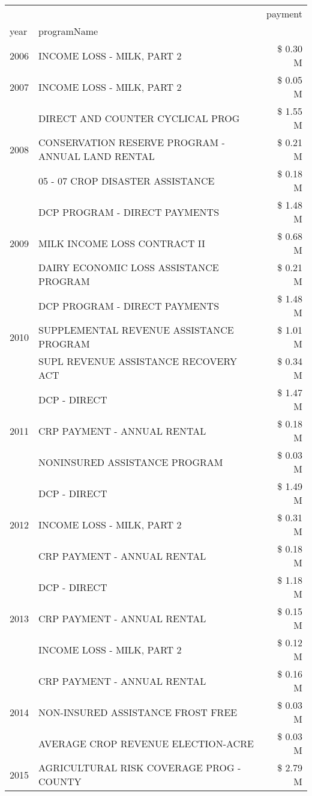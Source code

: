 \begin{tabular}{llr}
\toprule
 &  & payment \\
year & programName &  \\
\midrule
2006 & INCOME LOSS - MILK, PART 2 & \$ 0.30 M \\
\cline{1-3}
2007 & INCOME LOSS - MILK, PART 2 & \$ 0.05 M \\
\cline{1-3}
\multirow[t]{3}{*}{2008} & DIRECT AND COUNTER CYCLICAL PROG & \$ 1.55 M \\
 & CONSERVATION RESERVE PROGRAM - ANNUAL LAND RENTAL & \$ 0.21 M \\
 & 05 - 07 CROP DISASTER ASSISTANCE & \$ 0.18 M \\
\cline{1-3}
\multirow[t]{3}{*}{2009} & DCP PROGRAM - DIRECT PAYMENTS & \$ 1.48 M \\
 & MILK INCOME LOSS CONTRACT II & \$ 0.68 M \\
 & DAIRY ECONOMIC LOSS ASSISTANCE PROGRAM & \$ 0.21 M \\
\cline{1-3}
\multirow[t]{3}{*}{2010} & DCP PROGRAM - DIRECT PAYMENTS & \$ 1.48 M \\
 & SUPPLEMENTAL REVENUE ASSISTANCE PROGRAM & \$ 1.01 M \\
 & SUPL REVENUE ASSISTANCE RECOVERY ACT & \$ 0.34 M \\
\cline{1-3}
\multirow[t]{3}{*}{2011} & DCP - DIRECT & \$ 1.47 M \\
 & CRP PAYMENT - ANNUAL RENTAL & \$ 0.18 M \\
 & NONINSURED ASSISTANCE PROGRAM & \$ 0.03 M \\
\cline{1-3}
\multirow[t]{3}{*}{2012} & DCP - DIRECT & \$ 1.49 M \\
 & INCOME LOSS - MILK, PART 2 & \$ 0.31 M \\
 & CRP PAYMENT - ANNUAL RENTAL & \$ 0.18 M \\
\cline{1-3}
\multirow[t]{3}{*}{2013} & DCP - DIRECT & \$ 1.18 M \\
 & CRP PAYMENT - ANNUAL RENTAL & \$ 0.15 M \\
 & INCOME LOSS - MILK, PART 2 & \$ 0.12 M \\
\cline{1-3}
\multirow[t]{3}{*}{2014} & CRP PAYMENT - ANNUAL RENTAL & \$ 0.16 M \\
 & NON-INSURED ASSISTANCE FROST FREE & \$ 0.03 M \\
 & AVERAGE CROP REVENUE ELECTION-ACRE & \$ 0.03 M \\
\cline{1-3}
\multirow[t]{3}{*}{2015} & AGRICULTURAL RISK COVERAGE PROG - COUNTY & \$ 2.79 M \\

\end{tabular}
